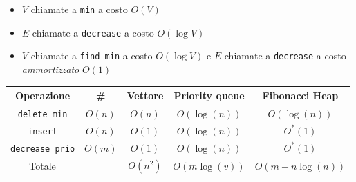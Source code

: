 \begin{itemize}
	\item {} $ V $ chiamate a \verb|min| a costo $ O\left(V\right) $
	\item {}  $ E $ chiamate a \verb|decrease| a costo $ O\left(\log V\right) $
	\item {}  $ V $ chiamate  a \verb|find_min| a costo $ O\left(\log V\right) $ e $ E $ chiamate a \verb|decrease| a costo \textit{ammortizzato} $ O\left(1\right) $
\end{itemize}
\begin{center}
	\begin{tabular}{c c c c c}
		\toprule
		Operazione           & \#                  & Vettore                & Priority queue                           & Fibonacci Heap                              \\
		\midrule
		\verb|delete min|    & $ O\left(n\right) $ & $ O\left(n\right) $    & $ O\left(\log \left(n\right)\right) $    & $ O\left(\log \left(n\right)\right) $       \\
		\verb|insert|        & $ O\left(n\right) $ & $ O\left(1\right) $    & $ O\left(\log \left(n\right)\right) $    & $ O^{*}\left(1\right) $                     \\
		\verb|decrease prio| & $ O\left(m\right) $ & $ O\left(1\right) $    & $ O\left(\log \left(n\right)\right) $    & $ O^{*}\left(1\right) $                     \\
		Totale               &                     & $ O\left(n^2 \right) $ & $ O \left(m \log \left(v\right)\right) $ & $ O\left(m + n \log \left(n\right)\right) $\\
		\bottomrule
	\end{tabular}
\end{center}


